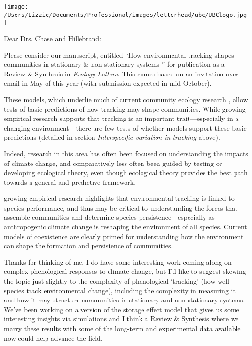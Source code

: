 \documentclass[12pt,a4paper]{letter}
\begin{document}
\begin{letter}{}
\texttt{[image: /Users/Lizzie/Documents/Professional/images/letterhead/ubc/UBClogo.jpg]}


\opening{Dear Drs. Chase and Hillebrand:}

Please consider our manuscript, entitled ``How environmental tracking shapes communities in stationary \& non-stationary systems '' for publication as a Review \& Synthesis in \emph{Ecology Letters}. This comes based on an invitation over email in May of this year (with submission expected in mid-October). 


These models, which underlie much of current community ecology research \citep{Mayfield:2010fe,barabas2018,ellner2019}, allow tests of basic predictions of how tracking may shape communities. While growing empirical research supports that tracking is an important trait---especially in a changing environment---there are few tests of whether models support these basic predictions (detailed in section \emph{Interspecific variation in tracking} above).

Indeed, research in this area has often been focused on understanding the impacts of climate change, and comparatively less often been guided by testing or developing ecological theory, even though ecological theory provides the best path towards a general and predictive framework. 


growing empirical research highlights that environmental tracking is linked to species performance, and thus may be critical to understanding the forces that assemble communities and determine species persistence---especially as anthropogenic climate change is reshaping the environment of all species. Current models of coexistence are clearly primed for understanding how the environment can shape the formation and persistence of communities.

Thanks for thinking of me. I do have some interesting work coming along on complex phenological responses to climate change, but I'd like to suggest skewing the topic just slightly to the complexity of phenological `tracking' (how well species track environmental change), including the complexity in measuring it and how it may structure communities in stationary and non-stationary systems. We've been working on a version of the storage effect model that gives us some interesting insights via simulations and I think a Review \& Synthesis where we marry these results with some of the long-term and experimental data available now could help advance the field.


\end{letter}
\end{document}
